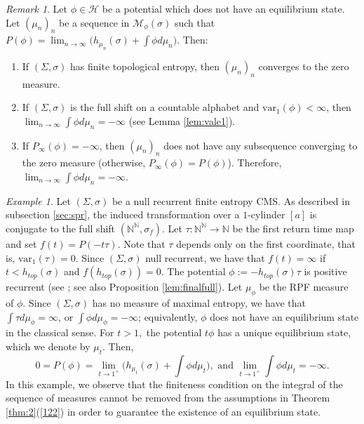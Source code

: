 \documentclass[letterpaper,11pt]{amsart}
\theoremstyle{plain}
\theoremstyle{plain}
\theoremstyle{definition}
\theoremstyle{remark}
\newtheorem{remark}{Remark}[section]
\newtheorem{example}{Example}
\def\N{{\mathbb N}}
\def\M{{\mathcal M}}
\def\H{{\mathcal H}}
\begin{document}
\begin{remark} 
Let $\phi\in \H$ be a potential which does not have an equilibrium state. Let $(\mu_n)_n$ be a sequence in $\M_{\phi}(\sigma)$ such that $P(\phi)=\lim_{n\to\infty} \big(h_{\mu_n}(\sigma)+\int \phi d\mu_n\big).$ Then:
\begin{enumerate}
\item If $(\Sigma,\sigma)$ has finite topological entropy, then $(\mu_n)_n$ converges to the zero measure. 
\item If $(\Sigma,\sigma)$ is the full shift on a countable alphabet and $\text{var}_1(\phi)<\infty$, then \\ $\lim_{n\to\infty}\int \phi d\mu_n=-\infty$ (see Lemma \ref{lem:vale1}).
\item If $P_\infty(\phi)=-\infty$, then $(\mu_n)_n$ does not have any subsequence converging to the zero measure (otherwise, $P_\infty(\phi)=P(\phi)$). Therefore, 
$\lim_{n\to\infty}\int \phi d\mu_n=-\infty$.
\end{enumerate}
\end{remark}

\begin{example}\label{addex} Let $(\Sigma,\sigma)$ be a null recurrent finite entropy CMS. As described in subsection  \ref{sec:spr}, the induced transformation over a $1$-cylinder $[a]$ is conjugate to the full shift $(\N^\N,\sigma_f)$. Let $\tau:\N^\N\to\N$ be the first return time map and set $f(t)=P(-t\tau)$. Note that $\tau$ depends only on the first coordinate, that is,  $\text{var}_1(\tau)=0$.  Since $(\Sigma,\sigma)$ null recurrent, we have that $f(t)=\infty$ if $t<h_{top}(\sigma)$ and $f(h_{top}(\sigma))=0$. The potential $\phi:=-h_{top}(\sigma)\tau$ is positive recurrent (see \cite[Corollary 2]{sap}; see also Proposition \ref{lem:finalfull}). Let $\mu_\phi$ be the RPF measure of $\phi$. Since $(\Sigma,\sigma)$ has no measure of maximal entropy, we have that $\int \tau d\mu_\phi=\infty$, or $\int \phi d\mu_\phi=-\infty$; equivalently, $\phi$ does not have an equilibrium state in the classical sense. For $t>1,$ the potential $t\phi$ has a unique equilibrium state, which we denote by $\mu_t$. Then,   $$0=P(\phi)=\lim_{t\to1^+}\big( h_{\mu_t}(\sigma)+\int \phi d\mu_t\big),\text{ and }\lim_{t\to 1^+}\int \phi d\mu_t=-\infty.$$
In this example, we observe that the finiteness  condition on the integral of the sequence of measures cannot be removed from the assumptions in Theorem \ref{thm:2}(\ref{122}) in order to guarantee the existence of an equilibrium state.
\end{example}
\end{document}
